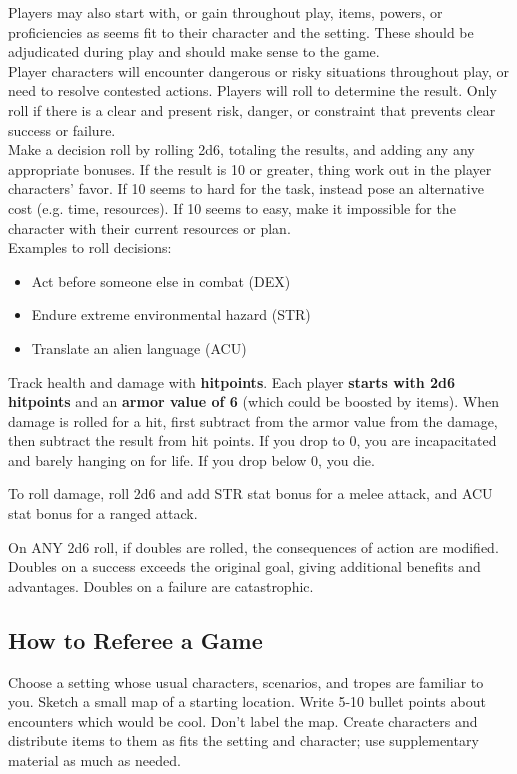 \documentclass[landscape]{book}
\begin{document}
\begin{multicols*}{4}
Players may also start with, or gain throughout play, items, powers, or proficiencies as seems fit to their character and the setting. These should be adjudicated during play and should make sense to the game. \\


Player characters will encounter dangerous or risky situations throughout play, or need to resolve contested actions.
Players will roll to determine the result.
Only roll if there is a clear and present risk, danger, or constraint that prevents clear success or failure. \\

Make a decision roll by rolling 2d6, totaling the results, and adding any any appropriate bonuses.
If the result is 10 or greater, thing work out in the player characters' favor.
If 10 seems to hard for the task, instead pose an alternative cost (e.g. time, resources).
If 10 seems to easy, make it impossible for the character with their current resources or plan.\\
Examples to roll decisions:
\begin{itemize}
\item Act before someone else in combat (DEX)
\item Endure extreme environmental hazard (STR)
\item Translate an alien language (ACU)
\end{itemize}

Track health and damage with \textbf{hitpoints}.
Each player \textbf{starts with 2d6 hitpoints} and an \textbf{armor value of 6} (which could be boosted by items).
When damage is rolled for a hit, first subtract from the armor value from the damage, then subtract the result from hit points.
If you drop to 0, you are incapacitated and barely hanging on for life.
If you drop below 0, you die.

To roll damage, roll 2d6 and add STR stat bonus for a melee attack, and ACU stat bonus for a ranged attack.

On ANY 2d6 roll, if doubles are rolled, the consequences of action are modified.
Doubles on a success exceeds the original goal, giving additional benefits and advantages.
Doubles on a failure are catastrophic. 

\subsection*{How to Referee a Game}

Choose a setting whose usual characters, scenarios, and tropes are familiar to you.
Sketch a small map of a starting location.
Write 5-10 bullet points about encounters which would be cool.
Don't label the map.
Create characters and distribute items to them as fits the setting and character; use supplementary material as much as needed. \\


\end{multicols*}
\end{document}
